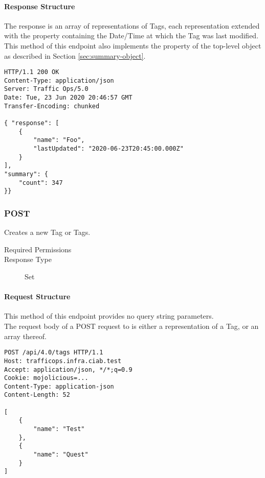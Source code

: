 \paragraph{Response Structure}
The response is an array of representations of Tags, each representation
extended with the  property containing the Date/Time at which
the Tag was last modified.\\
This method of this endpoint also implements the  property of the
top-level  object as described in Section
\ref{sec:summary-object}.

\begin{codelisting}
\begin{verbatim}
HTTP/1.1 200 OK
Content-Type: application/json
Server: Traffic Ops/5.0
Date: Tue, 23 Jun 2020 20:46:57 GMT
Transfer-Encoding: chunked

{ "response": [
	{
		"name": "Foo",
		"lastUpdated": "2020-06-23T20:45:00.000Z"
	}
],
"summary": {
	"count": 347
}}
\end{verbatim}
\end{codelisting}

\subsubsection{POST}
Creates a new Tag or Tags.
\begin{description}
	\item[Required Permissions] 
	\item[Response Type] Set
\end{description}

\paragraph{Request Structure}
This method of this endpoint provides no query string parameters.\\
The request body of a POST request to  is either a representation of
a Tag, or an array thereof.

\begin{codelisting}
\begin{verbatim}
POST /api/4.0/tags HTTP/1.1
Host: trafficops.infra.ciab.test
Accept: application/json, */*;q=0.9
Cookie: mojolicious=...
Content-Type: application-json
Content-Length: 52

[
	{
		"name": "Test"
	},
	{
		"name": "Quest"
	}
]
\end{verbatim}
\end{codelisting}

